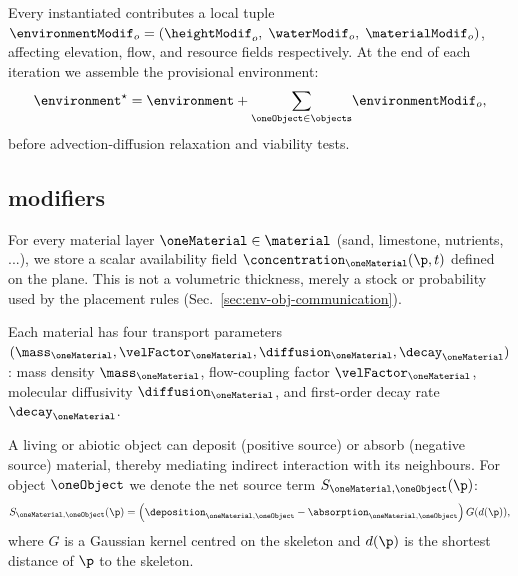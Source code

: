
\section{}
\label{sec:env-obj-materials}

Every instantiated  contributes a local  tuple $\environmentModif_o=(\heightModif_o, \;\waterModif_o, \;\materialModif_o)$, affecting elevation, flow, and resource fields respectively. At the end of each iteration we assemble the provisional environment:
\begin{align}
    \environment^{\star} = \environment + {\sum_{\oneObject\in\objects}}\environmentModif_o,
\end{align}
before advection-diffusion relaxation and viability tests.

\subsection{ modifiers}
For every material layer $\oneMaterial \in \material$ (sand, limestone, nutrients, ...), we store a scalar availability field $\concentration_\oneMaterial(\p,t)$ defined on the plane. This is not a volumetric thickness, merely a stock or probability used by the placement rules (Sec.~\ref{sec:env-obj-communication}).

Each material has four transport parameters $(\mass_\oneMaterial, \velFactor_\oneMaterial, \diffusion_\oneMaterial, \decay_\oneMaterial)$: mass density $\mass_\oneMaterial$, flow-coupling factor $\velFactor_\oneMaterial$, molecular diffusivity $\diffusion_\oneMaterial$, and first-order decay rate $\decay_\oneMaterial$.

A living or abiotic object can deposit (positive source) or absorb (negative source) material, thereby mediating indirect interaction with its neighbours. For object $\oneObject$ we denote the net source term $S_{\oneMaterial,\oneObject}(\p)$:
\begin{align}
    S_{\oneMaterial,\oneObject}(\p) = \left(\deposition_{\oneMaterial,\oneObject} - \absorption_{\oneMaterial,\oneObject}\right) G(d(\p)),
\end{align}
where $G$ is a Gaussian kernel centred on the skeleton and $d(\p)$ is the shortest distance of $\p$ to the skeleton.

